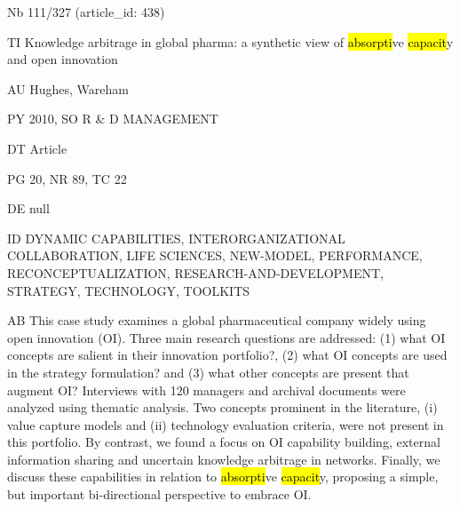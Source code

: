 \documentclass[a4paper]{article}
\begin{document}
\vspace*{-2cm}
Nb \tabto{0cm}111/327 (article\_id: 438)\par
TI \tabto{0cm}Knowledge arbitrage in global pharma: a synthetic view of \hl{absorpti}ve \hl{capacit}y and open innovation\par
AU \tabto{0cm}Hughes, Wareham\par
PY \tabto{0cm}2010, SO R \& D MANAGEMENT\par
DT \tabto{0cm}Article\par
PG \tabto{0cm}20, NR 89, TC 22\par
DE \tabto{0cm}null\par
ID \tabto{0cm}DYNAMIC CAPABILITIES, INTERORGANIZATIONAL COLLABORATION, LIFE SCIENCES, NEW-MODEL, PERFORMANCE, RECONCEPTUALIZATION, RESEARCH-AND-DEVELOPMENT, STRATEGY, TECHNOLOGY, TOOLKITS\par
AB \tabto{0cm}This case study examines a global pharmaceutical company widely using open innovation (OI). Three main research questions are addressed: (1) what OI concepts are salient in their innovation portfolio?, (2) what OI concepts are used in the strategy formulation? and (3) what other concepts are present that augment OI? Interviews with 120 managers and archival documents were analyzed using thematic analysis. Two concepts prominent in the literature, (i) value capture models and (ii) technology evaluation criteria, were not present in this portfolio. By contrast, we found a focus on OI capability building, external information sharing and uncertain knowledge arbitrage in networks. Finally, we discuss these capabilities in relation to \hl{absorpti}ve \hl{capacit}y, proposing a simple, but important bi-directional perspective to embrace OI.\par
\clearpage
\end{document}
